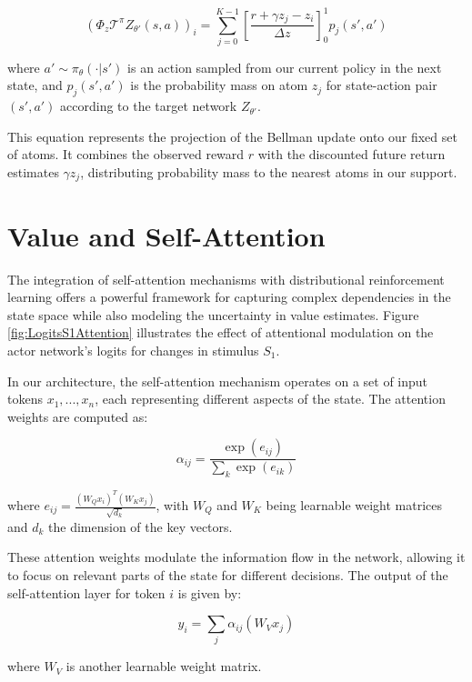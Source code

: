 \documentclass[12pt]{article}
\begin{document}
\begin{equation}
(\Phi_z \mathcal{T}^\pi Z_{\theta'}(s, a))_i = \sum_{j=0}^{K-1} [\frac{r + \gamma z_j - z_i}{\Delta z}]_0^1 p_j(s', a')
\end{equation}

where $a' \sim \pi_\theta(\cdot|s')$ is an action sampled from our current policy in the next state, and $p_j(s', a')$ is the probability mass on atom $z_j$ for state-action pair $(s', a')$ according to the target network $Z_{\theta'}$.

This equation represents the projection of the Bellman update onto our fixed set of atoms. It combines the observed reward $r$ with the discounted future return estimates $\gamma z_j$, distributing probability mass to the nearest atoms in our support.

\section{Value and Self-Attention}

The integration of self-attention mechanisms with distributional reinforcement learning offers a powerful framework for capturing complex dependencies in the state space while also modeling the uncertainty in value estimates. Figure \ref{fig:LogitsS1Attention} illustrates the effect of attentional modulation on the actor network's logits for changes in stimulus $S_1$.

In our architecture, the self-attention mechanism operates on a set of input tokens $x_1, ..., x_n$, each representing different aspects of the state. The attention weights are computed as:

\begin{equation}
\alpha_{ij} = \frac{\exp(e_{ij})}{\sum_k \exp(e_{ik})}
\end{equation}

where $e_{ij} = \frac{(W_Q x_i)^T (W_K x_j)}{\sqrt{d_k}}$, with $W_Q$ and $W_K$ being learnable weight matrices and $d_k$ the dimension of the key vectors.

These attention weights modulate the information flow in the network, allowing it to focus on relevant parts of the state for different decisions. The output of the self-attention layer for token $i$ is given by:

\begin{equation}
y_i = \sum_j \alpha_{ij} (W_V x_j)
\end{equation}

where $W_V$ is another learnable weight matrix.
\end{document}

